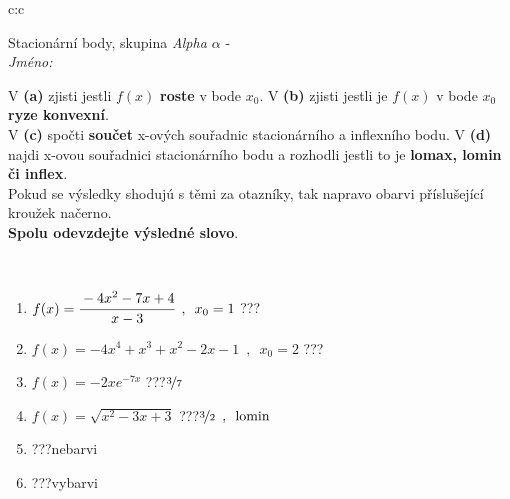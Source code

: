 \documentclass[10pt]{report}
\begin{document}
\thispagestyle{empty}
\begin{tabular}{c:c}
\begin{minipage}[c][104.5mm][t]{0.5\linewidth}
\begin{center}
\vspace{7mm}
{\huge Stacionární body, skupina \textit{Alpha $\alpha$} -}\\[5mm]
\textit{Jméno:}\phantom{xxxxxxxxxxxxxxxxxxxxxxxxxxxxxxxxxxxxxxxxxxxxxxxxxxxxxxxxxxxxxxxxx}\\[5mm]
\begin{minipage}{0.95\linewidth}
\begin{center}
{\small V \textbf{(a)} zjisti jestli $f(x)$ \textbf{roste} v bode $x_0$. V \textbf{(b)} zjisti jestli je $f(x)$ v bode $x_0$ \textbf{ryze konvexní}.\\V \textbf{(c)} spočti \textbf{součet} x-ových souřadnic stacionárního a inflexního bodu. V \textbf{(d)} najdi x-ovou souřadnici stacionárního bodu a rozhodli jestli to je \textbf{lomax, lomin či inflex}.\\Pokud se výsledky shodujú s těmi za otazníky, tak napravo obarvi příslušející kroužek načerno.\\\textbf{Spolu odevzdejte výsledné slovo}}.
\end{center}
\end{minipage}
\\[1mm]
\begin{minipage}{0.79\linewidth}
\begin{center}
\begin{varwidth}{\linewidth}
\begin{enumerate}
\normalsize
\item $f(x)=\cfrac{-4x^2-7x+4}{x-3}\enspace , \enspace x_0=1$\quad \dotfill\; ???\;\dotfill \quad {}
\item $f(x)=-4x^4+x^3+x^2-2x-1\enspace , \enspace x_0=2$\quad \dotfill\; ???\;\dotfill \quad {}
\item $f(x)=-2xe^{-7x}$\quad \dotfill\; ???\;\dotfill \quad $\nicefrac{3}{7}$
\item $f(x)=\sqrt{x^2-3x+3}$\quad \dotfill\; ???\;\dotfill \quad $\nicefrac{3}{2}\enspace , \enspace \mathrm{lomin}$
\item \quad \dotfill\; ???\;\dotfill \quad nebarvi
\item \quad \dotfill\; ???\;\dotfill \quad vybarvi
\end{enumerate}
\end{varwidth}
\end{center}

\end{minipage}
\end{center}
\end{minipage}
\end{tabular}
\end{document}
